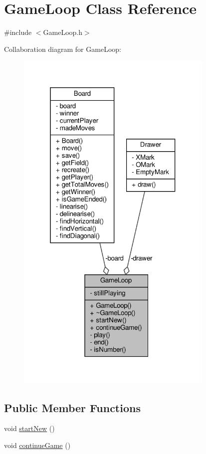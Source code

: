 \hypertarget{classGameLoop}{}\section{Game\+Loop Class Reference}
\label{classGameLoop}


{\ttfamily \#include $<$Game\+Loop.\+h$>$}



Collaboration diagram for Game\+Loop\+:
\nopagebreak
\begin{figure}[H]
\begin{center}
\leavevmode
\includegraphics[width=268pt]{classGameLoop__coll__graph}
\end{center}
\end{figure}
\subsection*{Public Member Functions}
\begin{DoxyCompactItemize}
\item 
void \hyperlink{classGameLoop_a12718de4b3e9535288cc77c8d5f27979}{start\+New} ()
\item 
void \hyperlink{classGameLoop_adc88e75cb8106655d88296cc082767bc}{continue\+Game} ()
\end{DoxyCompactItemize}

